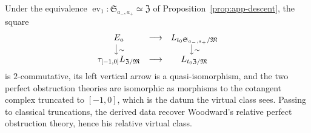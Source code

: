 \begin{proposition}
\label{prop:app-square}
Under the equivalence
\(\operatorname{ev}_1\colon\mathfrak S_{a_-,a_+}\simeq\mathfrak Z\) of
Proposition~\ref{prop:app-descent}, the square
\[
\begin{array}{ccc}
 E_a & \longrightarrow & L_{t_0\mathfrak S_{a_-,a_+}/\mathfrak M}\\
 \big\downarrow\scriptstyle\sim && \big\downarrow\scriptstyle\sim\\
 \tau_{[-1,0]}L_{\mathfrak Z/\mathfrak M}
   & \longrightarrow & L_{t_0\mathfrak Z/\mathfrak M}
\end{array}
\]
is \(2\)-commutative, its left vertical arrow is a quasi-isomorphism, and the two
perfect obstruction theories are isomorphic as morphisms to the cotangent
complex truncated to \([-1,0]\), which is the datum the virtual class sees.
Passing to classical truncations, the derived data recover Woodward's
relative perfect obstruction theory, hence his relative virtual class.
\end{proposition}

